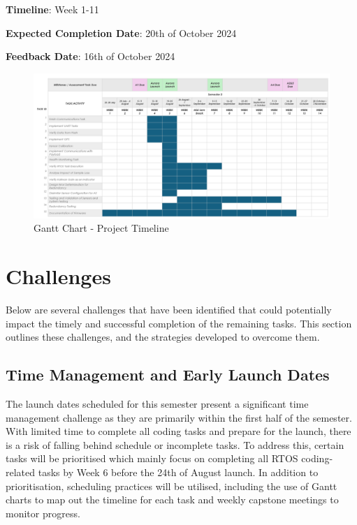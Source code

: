 \textbf{Timeline}: Week 1-11

\textbf{Expected Completion Date}: 20th of October 2024 

\textbf{Feedback Date}: 16th of October 2024

\clearpage 
\begin{landscape}
\thispagestyle{empty} 
\begin{figure}[!htbp] 
    \centering
    \includegraphics[width=\paperheight, height=\paperwidth, keepaspectratio]{img/Gantt-Chart-CP.png} 
    \caption{Gantt Chart - Project Timeline}
    \label{fig:Gantt Chart}
\end{figure}
\end{landscape}

\clearpage 



\section{Challenges}
Below are several challenges that have been identified that could potentially impact the timely and successful completion of the remaining tasks. This section outlines these challenges, and the strategies developed to overcome them.

\subsection{Time Management and Early Launch Dates}
The launch dates scheduled for this semester present a significant time management challenge as they are primarily within the first half of the semester. With limited time to complete all coding tasks and prepare for the launch, there is a risk of falling behind schedule or incomplete tasks. To address this, certain tasks will be prioritised which mainly focus on completing all RTOS coding-related tasks by Week 6 before the 24th of August launch. In addition to prioritisation, scheduling practices will be utilised, including the use of Gantt charts to map out the timeline for each task and weekly capstone meetings to monitor progress. 

